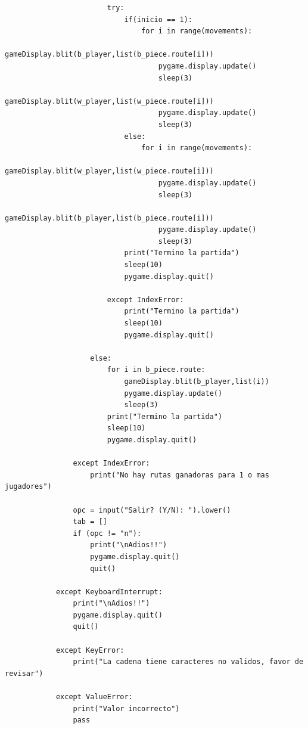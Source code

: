 \documentclass{article}
\begin{document}
\begin{lstlisting}
                        try:
                            if(inicio == 1):
                                for i in range(movements):
                                    gameDisplay.blit(b_player,list(b_piece.route[i]))
                                    pygame.display.update()
                                    sleep(3)
                                    gameDisplay.blit(w_player,list(w_piece.route[i]))
                                    pygame.display.update()
                                    sleep(3)
                            else:
                                for i in range(movements):
                                    gameDisplay.blit(w_player,list(w_piece.route[i]))
                                    pygame.display.update()
                                    sleep(3)
                                    gameDisplay.blit(b_player,list(b_piece.route[i]))
                                    pygame.display.update()
                                    sleep(3) 
                            print("Termino la partida")
                            sleep(10)
                            pygame.display.quit()
                        
                        except IndexError:
                            print("Termino la partida")
                            sleep(10)
                            pygame.display.quit()
                    
                    else:
                        for i in b_piece.route:
                            gameDisplay.blit(b_player,list(i))
                            pygame.display.update()
                            sleep(3)
                        print("Termino la partida")
                        sleep(10)
                        pygame.display.quit()
                
                except IndexError:
                    print("No hay rutas ganadoras para 1 o mas jugadores")
                
                opc = input("Salir? (Y/N): ").lower()
                tab = []
                if (opc != "n"):
                    print("\nAdios!!")
                    pygame.display.quit()
                    quit()
                    
            except KeyboardInterrupt:
                print("\nAdios!!")
                pygame.display.quit()
                quit()
                
            except KeyError:
                print("La cadena tiene caracteres no validos, favor de revisar")
            
            except ValueError:
                print("Valor incorrecto")
                pass
\end{lstlisting}
\end{document}
